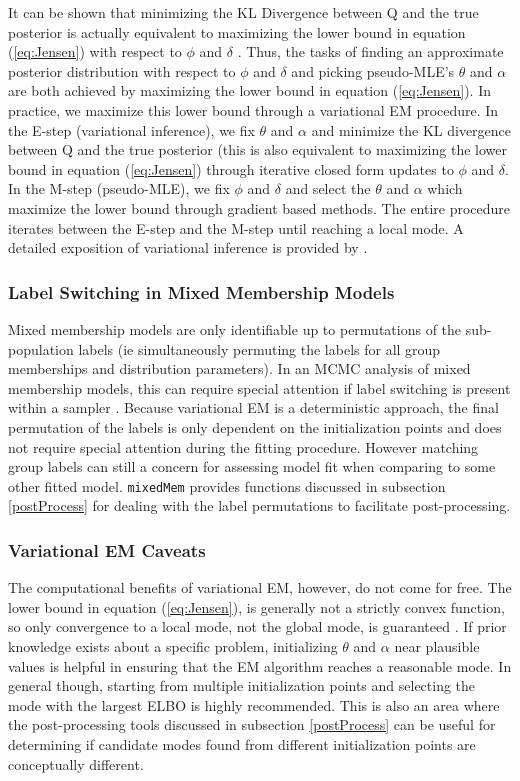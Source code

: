 \documentclass{article}\usepackage[]{graphicx}\usepackage[]{color}
\begin{document}
It can be shown that minimizing the KL Divergence between Q and the true posterior is actually equivalent to maximizing the lower bound in equation (\ref{eq:Jensen}) with respect to $\phi$ and $\delta$ \citep{beal2003variational}. Thus, the tasks of finding an approximate posterior distribution with respect to $\phi$ and $\delta$ and picking pseudo-MLE's $\theta$ and $\alpha$ are both achieved by maximizing the lower bound in equation (\ref{eq:Jensen}). In practice, we maximize this lower bound through a variational EM procedure. In the E-step (variational inference), we fix $\theta$ and $\alpha$ and minimize the KL divergence between Q and the true posterior   (this is also equivalent to maximizing the lower bound in equation (\ref{eq:Jensen}) through iterative closed form updates to $\phi$ and $\delta$. In the M-step (pseudo-MLE), we fix $\phi$ and $\delta$ and select the $\theta$ and $\alpha$ which maximize the lower bound through gradient based methods. The entire procedure iterates between the E-step and the M-step until reaching a local mode. A detailed exposition of variational inference is provided by \cite{jaakkola200110}.

\subsubsection{Label Switching in Mixed Membership Models}
Mixed membership models are only identifiable up to permutations of the sub-population labels (ie simultaneously permuting the labels for all group memberships and distribution parameters). In an MCMC analysis of mixed membership models, this can require special attention if label switching is present within a sampler \citep{stephens2000dealing}. Because variational EM is a deterministic approach, the final permutation of the labels is only dependent on the initialization points and does not require special attention during the fitting procedure. However matching group labels can still a concern for assessing model fit when comparing to some other fitted model. \texttt{mixedMem} provides functions discussed in subsection \ref{postProcess}  for dealing with the label permutations to facilitate post-processing.   

\subsubsection{Variational EM Caveats}
The computational benefits of variational EM, however, do not come for free. The lower bound in equation (\ref{eq:Jensen}), is generally not a strictly convex function, so only convergence to a local mode, not the global mode, is guaranteed \citep{wainwright2008graphical}. If prior knowledge exists about a specific problem, initializing $\theta$ and $\alpha$ near plausible values is helpful in ensuring that the EM algorithm reaches a reasonable mode. In general though, starting from multiple initialization points and selecting the mode with the largest ELBO is highly recommended. This is also an area where the post-processing tools discussed in subsection \ref{postProcess} can be useful for determining if candidate modes found from different initialization points are conceptually different.
\end{document}
